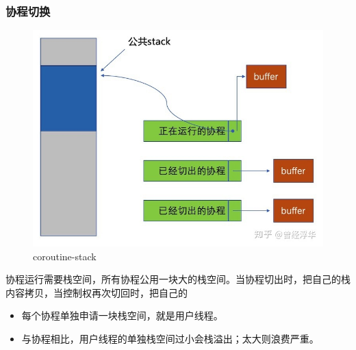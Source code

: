 \begin{frame}[fragile]
    \frametitle{协程切换}
% 
	\begin{figure}
		\centering
		\includegraphics[width=0.5\linewidth]{figs/coroutine-stack.jpg}
    \caption{coroutine-stack}
  \end{figure}



% 
协程运行需要栈空间，所有协程公用一块大的栈空间。当协程切出时，把自己的栈内容拷贝，当控制权再次切回时，把自己的%

    \begin{itemize}
        \item 每个协程单独申请一块栈空间，就是用户线程。
        \item 与协程相比，用户线程的单独栈空间过小会栈溢出；太大则浪费严重。 
    \end{itemize}
\end{frame}
% 
